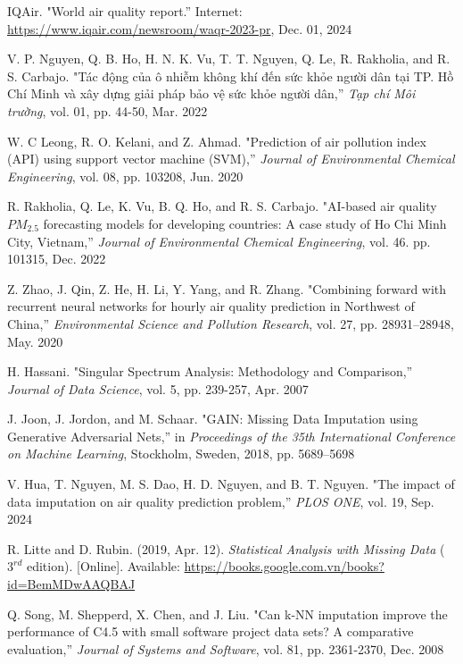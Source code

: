 \renewcommand{\labelsep}{1.5em} 

\begin{thebibliography}{99}
IQAir. "World air quality report.'' Internet: \url{https://www.iqair.com/newsroom/waqr-2023-pr}, Dec. 01, 2024

V. P. Nguyen, Q. B. Ho, H. N. K. Vu, T. T. Nguyen, Q. Le, R. Rakholia, and R. S. Carbajo. "Tác động của ô nhiễm không khí đến sức khỏe người dân tại TP. Hồ Chí Minh và xây dựng giải pháp bảo vệ sức khỏe người dân,'' \textit{Tạp chí Môi trường}, vol. 01, pp. 44-50, Mar. 2022

W. C Leong, R. O. Kelani, and Z. Ahmad. "Prediction of air pollution index (API) using support vector machine (SVM),'' \textit{Journal of Environmental Chemical Engineering}, vol. 08, pp. 103208, Jun. 2020

R. Rakholia, Q. Le, K. Vu, B. Q. Ho, and R. S. Carbajo. "AI-based air quality $PM_{2.5}$ forecasting models for developing countries: A case study of Ho Chi Minh City, Vietnam,'' \textit{Journal of Environmental Chemical Engineering}, vol. 46. pp. 101315, Dec. 2022

Z. Zhao, J. Qin, Z. He, H. Li, Y. Yang, and R. Zhang. "Combining forward with recurrent neural networks for hourly air quality prediction in Northwest of China,'' \textit{Environmental Science and Pollution Research}, vol. 27, pp. 28931–28948, May. 2020

H. Hassani. "Singular Spectrum Analysis: Methodology and Comparison,'' \textit{Journal of Data Science}, vol. 5, pp. 239-257, Apr. 2007

J. Joon, J. Jordon, and M. Schaar. "GAIN: Missing Data Imputation using Generative Adversarial Nets,'' in 
\textit{Proceedings of the 35th International Conference on Machine Learning}, Stockholm, Sweden, 2018, pp. 5689--5698

V. Hua, T. Nguyen, M. S. Dao, H. D. Nguyen, and B. T. Nguyen. "The impact of data imputation on air quality prediction problem,'' \textit{PLOS ONE}, vol. 19, Sep. 2024

R. Litte and D. Rubin. (2019, Apr. 12). \textit{Statistical Analysis with Missing Data} ($3^{rd}$ edition). [Online]. Available: \url{https://books.google.com.vn/books?id=BemMDwAAQBAJ}

Q. Song, M. Shepperd, X. Chen, and J. Liu. "Can k-NN imputation improve the performance of C4.5 with small software project data sets? A comparative evaluation,'' \textit{Journal of Systems and Software}, vol. 81, pp. 2361-2370, Dec. 2008


\end{thebibliography}
